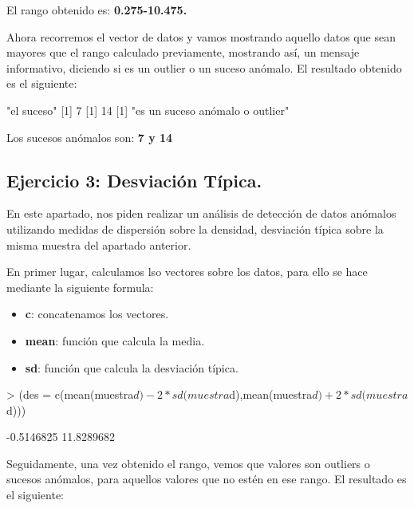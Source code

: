 \documentclass [a4paper] {article}
\begin{document}
El rango obtenido es: \textbf{0.275-10.475.}

Ahora recorremos el vector de datos y vamos mostrando aquello datos que sean mayores que el rango calculado
previamente, mostrando así, un mensaje informativo, diciendo si es un outlier o un suceso anómalo. El resultado
obtenido es el siguiente:

\begin{Schunk}
\begin{Soutput}
[1] "el suceso"
[1] 7
[1] 14
[1] "es un suceso anómalo o outlier"
\end{Soutput}
\end{Schunk}

Los sucesos anómalos son: \textbf{7 y 14}

\subsection{Ejercicio 3: Desviación Típica.}
En este apartado, nos piden realizar un análisis de detección de datos anómalos utilizando medidas de dispersión
sobre la densidad, desviación típica sobre la misma muestra del apartado anterior.

En primer lugar, calculamos lso vectores sobre los datos, para ello se hace mediante la siguiente formula:
\begin{itemize} 
	\item \textbf{c}:  concatenamos los vectores.
	\item \textbf{mean}: función que calcula la media.
	\item \textbf{sd}: función que calcula la desviación típica.
\end{itemize}

\begin{Schunk}
\begin{Sinput}
> (des = c(mean(muestra$d)-2*sd(muestra$d),mean(muestra$d)+2*sd(muestra$d)))
\end{Sinput}
\begin{Soutput}
[1] -0.5146825 11.8289682
\end{Soutput}
\end{Schunk}

Seguidamente, una vez obtenido el rango, vemos que valores son outliers o sucesos anómalos, para aquellos valores
que no estén en ese rango. El resultado es el siguiente:
\end{document}
